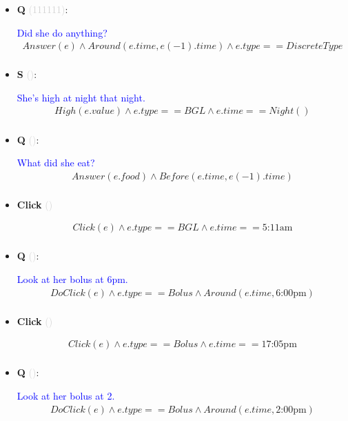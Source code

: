 \documentclass[11pt]{article}
\newcounter{CQ}
\newcounter{CS}
\newcounter{CClick}
\newcommand{\key}[1]{\textcolor{lightgray}{#1}}
\begin{document}
\begin{itemize}
	
	\item
	\textbf{Q\theCQ} \key{(111111)}: \addtocounter{CQ}{1}
	\textcolor{blue}{ Did she do anything? }
	\begin{multline*}
	Answer(e) \wedge Around(e.time, e(-1).time) \wedge e.type==DiscreteType \\
	\end{multline*}
	
	
	\item
	\textbf{S\theCS} \key{()}: \addtocounter{CS}{1}
	\textcolor{blue}{ She's high at night that night. }
	\begin{multline*}
	High(e.value) \wedge e.type==BGL \wedge e.time==Night()\\
	\end{multline*}
	
	
	\item
	\textbf{Q\theCQ} \key{()}: \addtocounter{CQ}{1}
	\textcolor{blue}{ What did she eat? }
	\begin{multline*}
	Answer(e.food) \wedge Before(e.time, e(-1).time) \\
	\end{multline*}
	
	
	
	\item
	\textbf{Click\theCClick} \key{()} \addtocounter{CClick}{1}
	\begin{multline*}
	Click(e) \wedge e.type == BGL \wedge e.time == \mbox{5:11am} \\
	\end{multline*}
	
	
	
	\item
	\textbf{Q\theCQ} \key{()}: \addtocounter{CQ}{1}
	\textcolor{blue}{ Look at her bolus at 6pm. }
	\begin{multline*}
	DoClick(e) \wedge e.type == Bolus \wedge Around(e.time, \mbox{6:00pm}) \\
	\end{multline*}
	
	
	\item
	\textbf{Click\theCClick} \key{()} \addtocounter{CClick}{1}
	\begin{multline*}
	Click(e) \wedge e.type == Bolus \wedge e.time == \mbox{17:05pm} \\
	\end{multline*}
	
	
	\item
	\textbf{Q\theCQ} \key{()}: \addtocounter{CQ}{1}
	\textcolor{blue}{ Look at her bolus at 2. }
	\begin{multline*}
	DoClick(e) \wedge e.type == Bolus \wedge Around(e.time, \mbox{2:00pm}) \\
	\end{multline*}
	

\end{itemize}
\end{document}
